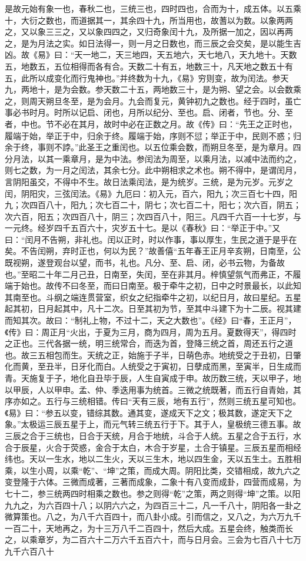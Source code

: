 \documentclass[12pt,UTF8]{ctexbook}
\begin{document}
是故元始有象一也，春秋二也，三统三也，四时四也，合而为十，成五体。以五乘十，大衍之数也，而道据其一，其余四十九，所当用也，故蓍以为数。以象两两之，又以象三三之，又以象四四之，又归奇象闰十九，及所据一加之，因以再两之，是为月法之实。如日法得一，则一月之日数也，而三辰之会交矣，是以能生吉凶。故《易》曰：“天一地二，天三地四，天五地六，天七地八，天九地十。天数五，地数五，五位相得而各有合。天数二十有五，地数三十，凡天地之数五十有五，此所以成变化而行鬼神也。”并终数为十九，《易》穷则变，故为闰法。参天九，两地十，是为会数。参天数二十五，两地数三十，是为朔、望之会。以会数乘之，则周天朔旦冬至，是为会月。九会而复元，黄钟初九之数也。经于四时，虽亡事必书时月。时所以记启、闭也，月所以纪分、至也。启、闭者，节也。分、至者，中也。节不必在其月，故时中必在正数之月。故《传》曰：“先王之正时也，履端于始，举正于中，归余于终。履端于始，序则不愆；举正于中，民则不惑；归余于终，事则不誖。”此圣王之重闰也。以五位乘会数，而朔旦冬至，是为章月。四分月法，以其一乘章月，是为中法。参闰法为周至，以乘月法，以减中法而约之，则七之数，为一月之闰法，其余七分。此中朔相求之术也。朔不得中，是谓闰月，言阴阳虽交，不得中不生。故日法乘闰法，是为统岁。三统，是为元岁。元岁之闰，阴阳灾，三弦闰法。《易》九厄曰：初入元，百六，阳九；次三百七十四，阳九；次四百八十，阳九；次七百二十，阴七；次七百二十，阳七；次六百，阴五；次六百，阳五；次四百八十，阴三；次四百八十，阳三。凡四千六百一十七岁，与一元终。经岁四千五百六十，灾岁五十七。是以《春秋》曰：“举正于中。”又曰：“闰月不告朔，非礼也。闰以正时，时以作事，事以厚生，生民之道于是乎在矣。不告闰朔，弃时正也，何以为民？”故善僖“五年春王正月辛亥朔，日南至，公既视朔，遂登观台以望，而书，礼也。凡分、至、启、闭，必书云物，为备故也。”至昭二十年二月己丑，日南至，失闰，至在非其月。梓慎望氛气而弗正，不履端于始也。故传不曰冬至，而曰日南至。极于牵牛之初，日中之时景最长，以此知其南至也。斗纲之端连贯营室，织女之纪指牵牛之初，以纪日月，故曰星纪。五星起其初，日月起其中，凡十二次。日至其初为节，至其中斗建下为十二辰。视其建而知其次。故曰：“制礼上物，不过十二，天之大数也”。《经》曰“春，王正月”，《传》曰：周正月“火出，于夏为三月，商为四月，周为五月。夏数得天”，得四时之正也。三代各据一统，明三统常合，而迭为首，登降三统之首，周还五行之道也。故三五相包而生。天统之正，始施于子半，日萌色赤。地统受之于丑初，日肇化而黄，至丑半，日牙化而白。人统受之于寅初，日孽成而黑，至寅半，日生成而青。天施复于子，地化自丑毕于辰，人生自寅成于申。故历数三统，天以甲子，地以甲辰，人以甲申。孟、仲、季迭用事为统首。三微之统既著，而五行自青始，其序亦如之。五行与三统相错。传曰“天有三辰，地有五行”，然则三统五星可知也。《易》曰：“参五以变，错综其数。通其变，遂成天下之文；极其数，遂定天下之象。”太极运三辰五星于上，而元气转三统五行于下。其于人，皇极统三德五事。故三辰之合于三统也，日合于天统，月合于地统，斗合于人统。五星之合于五行，水合于辰星，火合于荧惑，金合于太白，木合于岁星，土合于镇星。三辰五星而相经纬也。天以一生水，地以二生火，天以三生木，地以四生金，天以五生土。五胜相乘，以生小周，以乘“乾”、“坤”之策，而成大周。阴阳比类，交错相成，故九六之变登隆于六体。三微而成著，三著而成象，二象十有八变而成卦，四营而成易，为七十二，参三统两四时相乘之数也。参之则得“乾”之策，两之则得“坤”之策。以阳九九之，为六百四十八；以阴六六之，为四百三十二，凡一千八十，阴阳各一卦之微算策也。八之，为八千六百四十，而八卦小成。引而信之，又八之，为六万九千一百二十，天地再之，为十三万八千二百四十，然后大成。五星会终，触类而长之，以乘章岁，为二百六十二万六千五百六十，而与日月会。三会为七百八十七万九千六百八十
\end{document}
